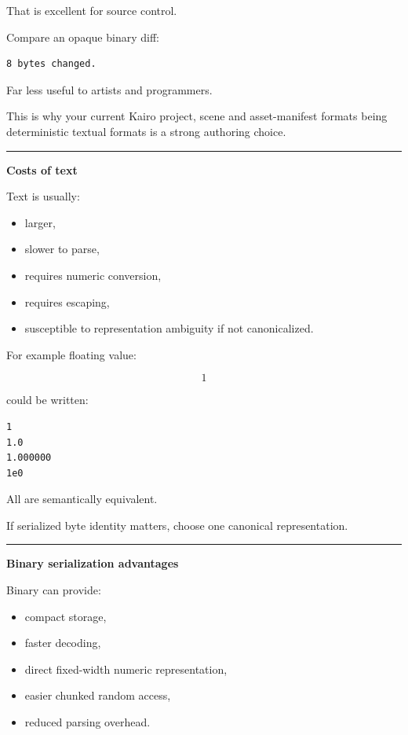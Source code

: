 That is excellent for source control.

Compare an opaque binary diff:

\begin{verbatim}
8 bytes changed.
\end{verbatim}

Far less useful to artists and programmers.

This is why your current Kairo project, scene and asset-manifest formats being deterministic textual formats is a strong authoring choice.

\begin{center}\rule{0.5\linewidth}{0.5pt}\end{center}

\textbf{Costs of text}

Text is usually:

\begin{itemize}
\tightlist
\item
  larger,
\item
  slower to parse,
\item
  requires numeric conversion,
\item
  requires escaping,
\item
  susceptible to representation ambiguity if not canonicalized.
\end{itemize}

For example floating value:

\[
1
\]

could be written:

\begin{verbatim}
1
1.0
1.000000
1e0
\end{verbatim}

All are semantically equivalent.

If serialized byte identity matters, choose one canonical representation.

\begin{center}\rule{0.5\linewidth}{0.5pt}\end{center}

\textbf{Binary serialization advantages}

Binary can provide:

\begin{itemize}
\tightlist
\item
  compact storage,
\item
  faster decoding,
\item
  direct fixed-width numeric representation,
\item
  easier chunked random access,
\item
  reduced parsing overhead.
\end{itemize}

